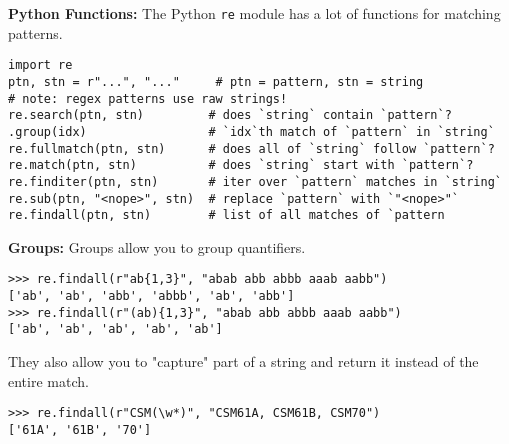 \textbf{Python Functions:}
The Python \lstinline$re$ module has a lot of functions for matching patterns.

\begin{lstlisting}
import re
ptn, stn = r"...", "..."     # ptn = pattern, stn = string
# note: regex patterns use raw strings!
re.search(ptn, stn)         # does `string` contain `pattern`?
.group(idx)                 # `idx`th match of `pattern` in `string`
re.fullmatch(ptn, stn)      # does all of `string` follow `pattern`?
re.match(ptn, stn)          # does `string` start with `pattern`?
re.finditer(ptn, stn)       # iter over `pattern` matches in `string`
re.sub(ptn, "<nope>", stn)  # replace `pattern` with `"<nope>"`
re.findall(ptn, stn)        # list of all matches of `pattern
\end{lstlisting}

\textbf{Groups:}
Groups allow you to group quantifiers.
\begin{lstlisting}
>>> re.findall(r"ab{1,3}", "abab abb abbb aaab aabb")
['ab', 'ab', 'abb', 'abbb', 'ab', 'abb']
>>> re.findall(r"(ab){1,3}", "abab abb abbb aaab aabb")
['ab', 'ab', 'ab', 'ab', 'ab']
\end{lstlisting}
They also allow you to "capture" part of a string and return it instead of the entire match.
\begin{lstlisting}
>>> re.findall(r"CSM(\w*)", "CSM61A, CSM61B, CSM70")
['61A', '61B', '70']
\end{lstlisting}